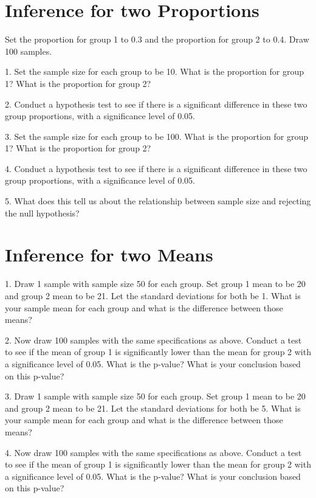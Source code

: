\documentclass[11pt]{amsart}
\begin{document}
\section{Inference for two Proportions}

Set the proportion for group 1 to 0.3 and the proportion for group 2 to 0.4.  Draw 100 samples.

1. Set the sample size for each group to be 10.  What is the proportion for group 1? What is the proportion for group 2?

2. Conduct a hypothesis test to see if there is a significant difference in these two group proportions, with a significance level of 0.05.


3. Set the sample size for each group to be 100.  What is the proportion for group 1? What is the proportion for group 2?

4. Conduct a hypothesis test to see if there is a significant difference in these two group proportions, with a significance level of 0.05.

5. What does this tell us about the relationship between sample size and rejecting the null hypothesis?


\section{Inference for two Means}
1. Draw 1 sample with sample size 50 for each group. Set group 1 mean to be 20 and group 2 mean to be 21.  Let the standard deviations for both be 1.  What is your sample mean for each group and what is the difference between those means?

2. Now draw 100 samples with the same specifications as above. Conduct a test to see if the mean of group 1 is significantly lower than the mean for group 2 with a significance level of 0.05. What is the p-value? What is your conclusion based on this p-value?

3. Draw 1 sample with sample size 50 for each group. Set group 1 mean to be 20 and group 2 mean to be 21.  Let the standard deviations for both be 5.  What is your sample mean for each group and what is the difference between those means?

4. Now draw 100 samples with the same specifications as above. Conduct a test to see if the mean of group 1 is significantly lower than the mean for group 2 with a significance level of 0.05. What is the p-value? What is your conclusion based on this p-value?
\end{document}
